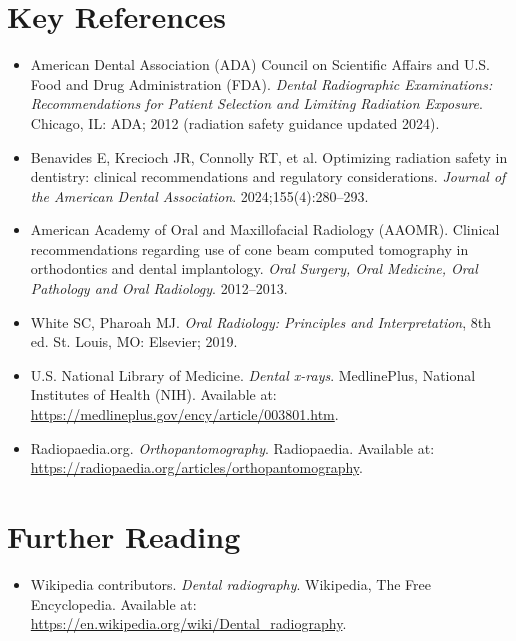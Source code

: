 \section{Key References}
\begin{itemize}
\item American Dental Association (ADA) Council on Scientific Affairs and U.S. Food and Drug Administration (FDA). \textit{Dental Radiographic Examinations: Recommendations for Patient Selection and Limiting Radiation Exposure}. Chicago, IL: ADA; 2012 (radiation safety guidance updated 2024).
\item Benavides E, Krecioch JR, Connolly RT, et al. Optimizing radiation safety in dentistry: clinical recommendations and regulatory considerations. \textit{Journal of the American Dental Association}. 2024;155(4):280--293.
\item American Academy of Oral and Maxillofacial Radiology (AAOMR). Clinical recommendations regarding use of cone beam computed tomography in orthodontics and dental implantology. \textit{Oral Surgery, Oral Medicine, Oral Pathology and Oral Radiology}. 2012--2013.
\item White SC, Pharoah MJ. \textit{Oral Radiology: Principles and Interpretation}, 8th ed. St. Louis, MO: Elsevier; 2019.
\item U.S. National Library of Medicine. \textit{Dental x-rays}. MedlinePlus, National Institutes of Health (NIH). Available at: \url{https://medlineplus.gov/ency/article/003801.htm}.
\item Radiopaedia.org. \textit{Orthopantomography}. Radiopaedia. Available at: \url{https://radiopaedia.org/articles/orthopantomography}.
\end{itemize}

\section{Further Reading}
\begin{itemize}
  \item Wikipedia contributors. \textit{Dental radiography}. Wikipedia, The Free Encyclopedia. Available at: \url{https://en.wikipedia.org/wiki/Dental_radiography}.
\end{itemize}
